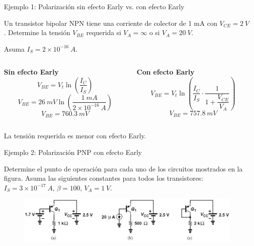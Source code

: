 \documentclass[t,aspectratio=169]{beamer}
\begin{document}
\begin{frame}{Ejemplo 1: Polarización sin efecto Early vs. con efecto Early}

Un transistor bipolar NPN tiene una corriente de colector de 1 mA con $V_{CE} = 2\ V$. Determine la tensión $V_{BE}$ requerida si $V_A = \infty$ o si $V_A = 20\ V$. 

Asuma $I_S = 2\times{}10^{-16}\ A$.


\begin{columns}
\begin{column}{0.5\textwidth}

\centering
\textbf{Sin efecto Early}
\[ V_{BE} = V_t \ln \left(\dfrac{I_C}{I_S}\right) \]
\[ V_{BE} = 26\ mV \ln \left(\dfrac{1\ mA}{2\times{}10^{-16}\ A}\right) \]
\[ V_{BE} = 760.3\ mV \]

\end{column}
\begin{column}{0.5\textwidth}

\centering
\textbf{Con efecto Early}
\[ V_{BE} = V_t \ln \left( \dfrac{I_C}{I_S} \cdot \dfrac{1}{1 + \dfrac{V_{CE}}{V_A}} \right) \]
\[ V_{BE} = 757.8\ mV \]

\end{column}
\end{columns}

\vspace{5mm}
La tensión requerida es menor con efecto Early.
\end{frame}


\begin{frame}{Ejemplo 2: Polarización PNP con efecto Early}

Determine el punto de operación para cada uno de los circuitos mostrados en la figura. Asuma las siguientes constantes para todos los transistores: $I_S = 3\times{}10^{-17}\ A$, $\beta=100$, $V_A = 1\ V$.

\begin{figure}
    \centering
    \includegraphics[width=\textwidth]{figuras/efecto_early_ejemplo_2.png}
\end{figure}
    
\end{frame}
\end{document}
